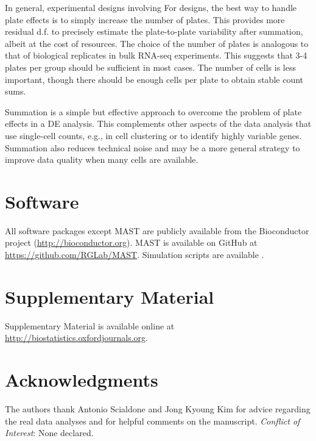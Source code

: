 \documentclass[oupdraft]{bio}
\begin{document}
In general, experimental designs involving 
For  designs, the best way to handle plate effects is to simply increase the number of plates.
This provides more residual d.f. to precisely estimate the plate-to-plate variability after summation, albeit at the cost of  resources.
The choice of the number of plates is analogous to that of biological replicates in bulk RNA-seq experiments.
This suggests that 3-4 plates per group should be sufficient in most cases.
The number of cells is less important, though there should be enough cells per plate to obtain stable count sums.

Summation is a simple but effective approach to overcome the problem of plate effects in a DE analysis. 
This complements other aspects of the data analysis that use single-cell counts, e.g., in cell clustering or to identify highly variable genes.
Summation also reduces technical noise and may be a more general strategy to improve data quality when many cells are available.

\section{Software}
All software packages except MAST are publicly available from the Bioconductor project (\url{http://bioconductor.org}).
MAST is available on GitHub at \url{https://github.com/RGLab/MAST}.
Simulation scripts are available .

\section{Supplementary Material}
Supplementary Material is available online at \href{http://biostatistics.oxfordjournals.org}{http://biostatistics.oxfordjournals.org}.

\section*{Acknowledgments}
The authors thank Antonio Scialdone and Jong Kyoung Kim for advice regarding the real data analyses and for helpful comments on the manuscript.
{\it Conflict of Interest}: None declared.
\end{document}
